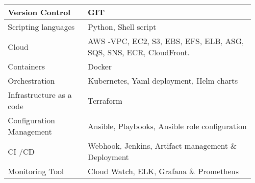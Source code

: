 \documentclass[10pt,a4paper,ragged2e,withhyper]{altacv}
\begin{document}
{\begin{paracol}{2}
\switchcolumn
{}
\large{
    \begin{tabular}{ |p{3cm}||p{3cm}|  }
     \hline
        Version Control &   GIT  \\ \hline
        Scripting languages   & Python, Shell script\\ \hline
        Cloud &   AWS -VPC, EC2, S3, EBS, EFS, ELB, ASG, SQS, SNS, ECR,     CloudFront.  \\ \hline
        Containers &   Docker  \\ \hline
        Orchestration &   Kubernetes, Yaml deployment, Helm charts  \\ \hline
        Infrastructure as a code &   Terraform  \\ \hline
        Configuration Management &  Ansible, Playbooks, Ansible role configuration   \\ \hline
        CI \slash CD &  Webhook, Jenkins, Artifact management \& Deployment  \\     \hline
        Monitoring Tool &   Cloud Watch, ELK, Grafana \& Prometheus  \\ \hline
     \hline
    \end{tabular}
}


\end{paracol}}
\end{document}
